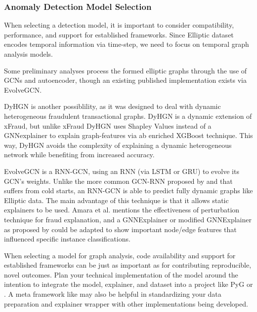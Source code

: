\subsubsection{Anomaly Detection Model Selection}
When selecting a detection model, it is important to consider compatibility, performance, and support for established frameworks. Since Elliptic dataset encodes temporal information via time-step, we need to focus on temporal graph analysis models.

Some preliminary analyses process the formed elliptic graphs through the use of GCNs\cite{karthika_gcn_2021}\cite{yang_transfer_2020} and autoencoder\cite{soto_fraud_2021}, though an existing published implementation exists via EvolveGCN\cite{pareja_evolvegcn_2019}.

DyHGN\cite{rao_modelling_2022} is another possiblility, as it was designed to deal with dynamic heterogeneous fraudulent transactional graphs. DyHGN is a dynamic extension of xFraud\cite{rao_xfraud_2021}, but unlike xFraud DyHGN uses Shapley Values instead of a GNNexplainer to explain graph-features via ab enriched XGBoost technique. This way, DyHGN avoids the complexity of explaining a dynamic heterogeneous network while benefiting from increased accuracy.

EvolveGCN\cite{pareja_evolvegcn_2019} is a RNN-GCN, using an RNN (via LSTM or GRU) to evolve its GCN's weights. Unlike the more common GCN-RNN proposed by \cite{narayan_learning_2018} and \cite{xie_explaining_2022} that suffers from cold starts, an RNN-GCN is able to predict fully dynamic graphs like Elliptic data. The main advantage of this technique is that it allows static explainers to be used. Amara et al.\cite{amara_graphframex_2022} mentions the effectiveness of perturbation technique for fraud explanation, and a GNNExplainer or modified GNNExplainer as proposed by \cite{rao_xfraud_2021} could be adapted to show important node/edge features that influenced specific instance classifications.

When selecting a model for graph analysis, code availability and support for established frameworks can be just as important as  for contributing reproducible, novel outcomes. Plan your technical implementation of the model around the intention to integrate the model, explainer, and dataset into a project like PyG\cite{pyg_team_pyg_nodate} or \cite{liu_pygod-teampygod_2023}. A meta framework like \cite{dive_lab_dig_nodate} may also be helpful in standardizing your data preparation and explainer wrapper with other implementations being developed.

